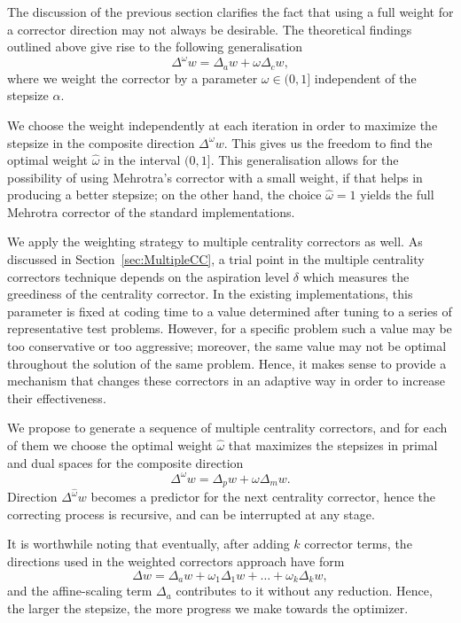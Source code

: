 The discussion of the previous section clarifies the fact that
using a full weight for a corrector direction may not always be
desirable.
The theoretical findings 
outlined above give rise to the following generalisation
\[
  \Delta^\omega w = \Delta_a w +\omega\Delta_c w,
\]
where we weight the corrector by a parameter $\omega\in(0,1]$ 
independent of the stepsize $\alpha$.

We choose the weight independently at each iteration in order 
to maximize the stepsize in the composite direction $\Delta^\omega w$.
This gives us the freedom to find the optimal weight 
$\hat\omega$ in the interval $(0,1]$.
%
This generalisation allows for the possibility of using Mehrotra's 
corrector with a small weight, if that helps in producing a better
stepsize; on the other hand, 
the choice $\hat\omega=1$ yields the full Mehrotra corrector of
the standard implementations. 

We apply the weighting strategy to multiple centrality correctors 
as well. 
As discussed in Section~\ref{sec:MultipleCC}, a trial point 
in the multiple centrality correctors technique depends on the
aspiration level
$\delta$ which measures the greediness of the centrality corrector. 
In the existing implementations, this parameter is fixed at coding time 
to a value determined after tuning to a series of representative 
test problems. However, for a specific problem such a value may be 
too conservative or too aggressive; moreover, the same value may not 
be optimal throughout the solution of the same problem. 
Hence, it makes sense to provide 
a mechanism that changes these correctors in an adaptive way in order 
to increase their effectiveness.

We propose to generate a sequence of multiple centrality 
correctors, and for each of them we choose the optimal weight 
$\hat \omega$ that  maximizes the stepsizes in primal and dual spaces 
for the composite direction
\[
 \Delta^\omega w = \Delta_p w +\omega\Delta_m w.
\]
Direction $\Delta^{\hat\omega} w$ becomes
a predictor for the next centrality corrector, hence the correcting process
is recursive, and can be interrupted at any stage.

It is worthwhile noting that eventually, after adding $k$ corrector terms, 
the directions used in the weighted correctors approach have form
\[
  \Delta w = \Delta_a w + \omega_1\Delta_1 w + \ldots + \omega_k\Delta_k w,
\]
and the affine-scaling term $\Delta_a$ contributes to it without any
reduction. Hence, the larger the stepsize, the more progress we make
towards the optimizer.


